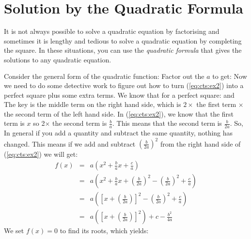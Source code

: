 \section{Solution by the Quadratic Formula}

It is not always possible to solve a quadratic equation by factorising and sometimes it is lengthy and tedious to solve a quadratic equation by completing the square. In these situations, you can use the \textit{quadratic formula} that gives the solutions to any quadratic equation.

Consider the general form of the quadratic function:
Factor out the $a$ to get:
Now we need to do some detective work to figure out how to turn (\ref{eq:cts:ex2}) into a perfect square plus some extra terms. We know that for a perfect square:
and
The key is the middle term on the right hand side, which is $2\times$ the first term $\times$ the second term of the left hand side.
In (\ref{eq:cts:ex2}), we know that the first term is $x$ so 2$\times$ the second term is $\frac{b}{a}$. This means that the second term is $\frac{b}{2a}$. So,
In general if you add a quantity and subtract the same quantity, nothing has changed. This means if we add and subtract $\left(\frac{b}{2a}\right)^2$ from the right hand side of (\ref{eq:cts:ex2}) we will get:
\begin{eqnarray}
f(x)&=&a(x^2+\frac{b}{a}x+\frac{c}{a})\\
&=&a\left(x^2+\frac{b}{a}x+\left(\frac{b}{2a}\right)^2 - \left(\frac{b}{2a}\right)^2+\frac{c}{a}\right)\\
&=&a\left(\left[x+\left(\frac{b}{2a}\right)\right]^2 - \left(\frac{b}{2a}\right)^2+\frac{c}{a}\right)\\
&=&a\left(\left[x+\left(\frac{b}{2a}\right)\right]^2\right) +c- \frac{b^2}{4a}
\end{eqnarray}
We set $f(x)=0$ to find its roots, which yields:

